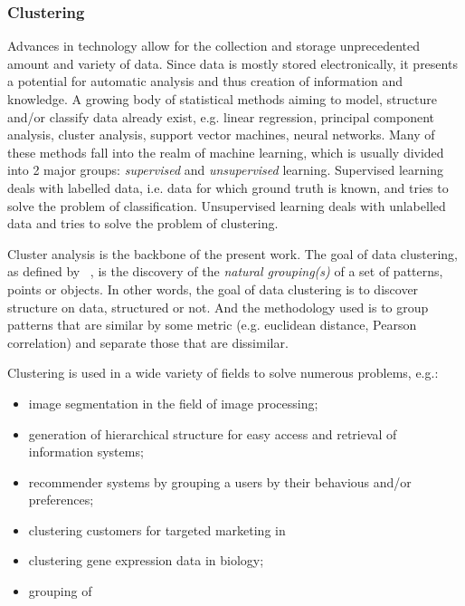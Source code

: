 \subsubsection{Clustering}
\label{sec:clustering}

Advances in technology allow for the collection and storage unprecedented amount and variety of data. Since data is mostly stored electronically, it presents a potential for automatic analysis and thus creation of information and knowledge. A growing body of statistical methods aiming to model, structure and/or classify data already exist, e.g. linear regression, principal component analysis, cluster analysis, support vector machines, neural networks. Many of these methods fall into the realm of machine learning, which is usually divided into 2 major groups: \textit{supervised} and \textit{unsupervised} learning.
Supervised learning deals with labelled data, i.e. data for which ground truth is known, and tries to solve the problem of classification. Unsupervised learning deals with unlabelled data and tries to solve the problem of clustering.

Cluster analysis is the backbone of the present work.
The goal of data clustering, as defined by ~\cite{Jain2010}, is the discovery of the \textit{natural grouping(s)} of a set of patterns, points or objects. In other words, the goal of data clustering is to discover structure on data, structured or not.
And the methodology used is to group patterns that are similar by some metric (e.g. euclidean distance, Pearson correlation) and separate those that are dissimilar. %

Clustering is used in a wide variety of fields to solve numerous problems, e.g.:
\begin{itemize}
\item image segmentation in the field of image processing;
\item generation of hierarchical structure for easy access and retrieval of information systems;
\item recommender systems by grouping a users by their behavious and/or preferences;
\item clustering customers for targeted marketing in 
\item clustering gene expression data in biology;
\item grouping of 
\end{itemize}



